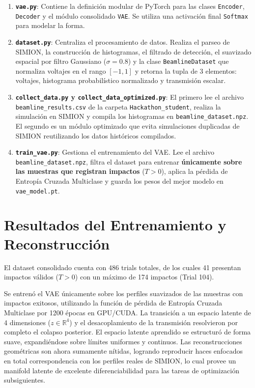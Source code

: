 \documentclass[12pt,letterpaper]{article}
\begin{document}
\begin{enumerate}
    \item \textbf{\texttt{vae.py}}: Contiene la definición modular de PyTorch para las clases \texttt{Encoder}, \texttt{Decoder} y el módulo consolidado \texttt{VAE}. Se utiliza una activación final \texttt{Softmax} para modelar la forma.
    \item \textbf{\texttt{dataset.py}}: Centraliza el procesamiento de datos. Realiza el parseo de SIMION, la construcción de histogramas, el filtrado de detección, el suavizado espacial por filtro Gaussiano ($\sigma=0.8$) y la clase \texttt{BeamlineDataset} que normaliza voltajes en el rango $[-1, 1]$ y retorna la tupla de 3 elementos: voltajes, histograma probabilístico normalizado y transmisión escalar.
    \item \textbf{\texttt{collect\_data.py} y \texttt{collect\_data\_optimized.py}}: El primero lee el archivo \texttt{beamline\_results.csv} de la carpeta \texttt{Hackathon\_student}, realiza la simulación en SIMION y compila los histogramas en \texttt{beamline\_dataset.npz}. El segundo es un módulo optimizado que evita simulaciones duplicadas de SIMION reutilizando los datos históricos compilados.
    \item \textbf{\texttt{train\_vae.py}}: Gestiona el entrenamiento del VAE. Lee el archivo \texttt{beamline\_dataset.npz}, filtra el dataset para entrenar \textbf{únicamente sobre las muestras que registran impactos} ($T > 0$), aplica la pérdida de Entropía Cruzada Multiclase y guarda los pesos del mejor modelo en \texttt{vae\_model.pt}.
\end{enumerate}

\section{Resultados del Entrenamiento y Reconstrucción}
El dataset consolidado cuenta con 486 trials totales, de los cuales 41 presentan impactos válidos ($T > 0$) con un máximo de 174 impactos (Trial 104). 

Se entrenó el VAE únicamente sobre los perfiles suavizados de las muestras con impactos exitosos, utilizando la función de pérdida de Entropía Cruzada Multiclase por 1200 épocas en GPU/CUDA. La transición a un espacio latente de 4 dimensiones ($z \in \mathbb{R}^4$) y el desacoplamiento de la transmisión resolvieron por completo el colapso posterior. El espacio latente aprendido se estructuró de forma suave, expandiéndose sobre límites uniformes y continuos. Las reconstrucciones geométricas son ahora sumamente nítidas, logrando reproducir haces enfocados en total correspondencia con los perfiles reales de SIMION, lo cual provee un manifold latente de excelente diferenciabilidad para las tareas de optimización subsiguientes.
\end{document}
